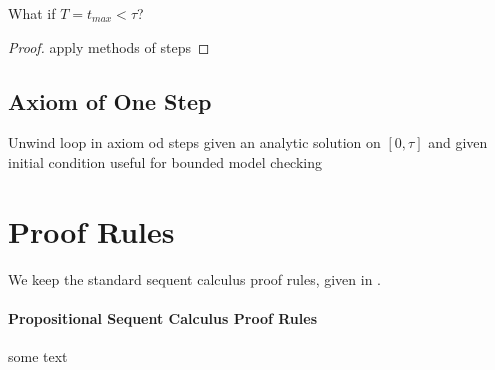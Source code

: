 \documentclass[10pt]{report}
\begin{document}
            \begin{calculus}


            \end{calculus}

            What if $T=t_{max} < \tau$?

            \begin{proof}
                apply methods of steps
            \end{proof}

        \subsection{Axiom of One Step}
            \label{sex:axiom-of-one-step}

            Unwind loop in axiom od steps
            given an analytic solution on $[0,\tau]$ and given initial condition
            useful for bounded model checking

    \section{Proof Rules}
        \label{sec:proof-rules}

        We keep the standard sequent calculus proof rules, given in \dL.

        \paragraph{Propositional Sequent Calculus Proof Rules}
            \label{sec:propositional-rules}

            some text
\end{document}
